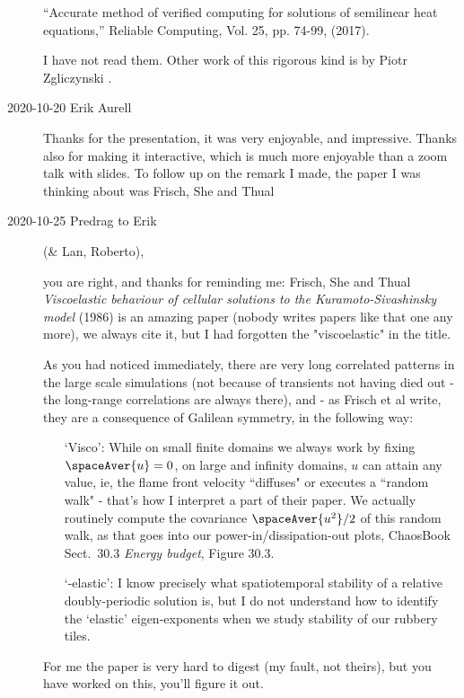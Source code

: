 \begin{description}
{``Accurate method of verified computing for solutions of semilinear heat
equations,'' Reliable Computing, Vol. 25, pp. 74-99, (2017).

I have not read them.
Other work of this rigorous kind is by Piotr Zgliczynski \etal.
    }

\newpage
\item[2020-10-20 Erik Aurell]
Thanks for the presentation, it was very enjoyable, and impressive.
Thanks also for making it interactive, which is much more enjoyable than
a zoom talk with slides. To follow up on the remark I made, the paper I
was thinking about was Frisch, She and Thual

\item[2020-10-25 Predrag to Erik] (\& Lan, Roberto),

you are right, and thanks for reminding me:
Frisch, She and Thual {\em Viscoelastic behaviour of cellular
solutions to the Kuramoto-Sivashinsky model} (1986)
is an amazing paper (nobody writes papers like that one any more), we
always cite it, but I had forgotten the "viscoelastic" in the title.

As you had noticed immediately, there are very long correlated patterns
in the large scale simulations (not because of transients not having died
out - the long-range correlations are always there), and - as Frisch et
al write, they are a consequence of Galilean symmetry, in the following
way:


\begin{itemize}
  \item[`Visco': ]
While on small finite domains we always work by fixing $\spaceAver{u}=0$,
on large and infinity domains, $u$ can attain any value, ie, the flame
front velocity ``diffuses" or executes a ``random walk" - that's how I
interpret a part of their paper. We actually routinely compute the
covariance $\spaceAver{u^2}/2$ of this random walk, as that goes into our
power-in/dissipation-out plots, ChaosBook
{Sect.~30.3} {\em Energy budget}, Figure 30.3.

  \item[`-elastic':]
I know precisely what spatiotemporal stability of a relative
doubly-periodic solution is, but I do not understand how to identify the
`elastic' eigen-exponents when we study stability of our rubbery tiles.
\end{itemize}

For me the paper is very hard to digest (my fault, not theirs), but you
have worked on this, you'll figure it out.


\end{description}
